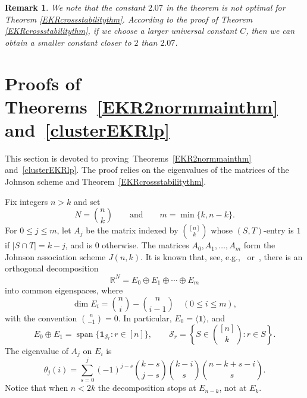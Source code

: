 \documentclass[10pt,a4paper]{amsart}
\numberwithin{equation}{section}
\newtheorem{remark}[theorem]{Remark}
\begin{document}
\begin{remark}
We note that the constant $2.07$ in the theorem is not optimal for Theorem \ref{EKRcrossstabilitythm}.
According to the proof of Theorem \ref{EKRcrossstabilitythm},
if we choose a larger universal constant $C$, then we can obtain a smaller constant closer to $2$ than $2.07$.
\end{remark}



\section{Proofs of Theorems~\ref{EKR2normmainthm} and~\ref{clusterEKRlp}}
\label{sec:proof-main}



This section is devoted to proving~Theorems~\ref{EKR2normmainthm} and~\ref{clusterEKRlp}.
The proof relies on the eigenvalues of the matrices
of the Johnson scheme and Theorem~\ref{EKRcrossstabilitythm}.




Fix integers $n>k$ and set
\[
N=\binom{n}{k}
\qquad\text{and}\qquad
m=\min\{k,n-k\}.
\]
For $0\leq j\leq m$, let $A_j$ be the matrix indexed by
$\binom{[n]}{k}$ whose $(S,T)$-entry is $1$ if $|S\cap T|=k-j$, and is
$0$ otherwise.  The matrices $A_0,A_1,\ldots,A_m$ form the Johnson
association scheme $J(n,k)$.
It is known that, see, e.g.,~\cite{Delsarte} or~\cite[Chapter 6]{GodsilEKRbook}, there is an orthogonal decomposition
\[
\mathbb{R}^{N}=E_0\oplus E_1\oplus\cdots\oplus E_m
\]
into common eigenspaces, where
\[
\dim E_i=\binom{n}{i}-\binom{n}{i-1}
\quad (0\leq i\leq m),
\]
with the convention $\binom{n}{-1}=0$.  In particular,
$E_0=\langle\mathbf{1}\rangle$, and
\[
E_0\oplus E_1
=\operatorname{span}\{\mathbf{1}_{\mathcal{S}_r}:r\in[n]\},
\qquad
\mathcal{S}_r=\left\{S\in\binom{[n]}{k}:r\in S\right\}.
\]
The eigenvalue of $A_j$ on $E_i$ is
\[
\theta_j(i)
=\sum_{s=0}^{j}(-1)^{j-s}
\binom{k-s}{j-s}\binom{k-i}{s}
\binom{n-k+s-i}{s}.
\]
Notice that when $n<2k$ the decomposition stops at $E_{n-k}$, not at
$E_k$.
\end{document}
